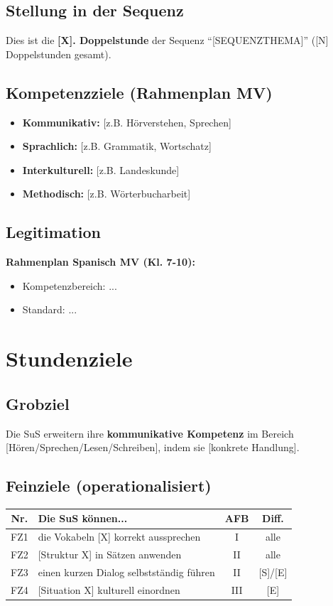 \documentclass[11pt,a4paper]{article}
\newcommand{\reihenthema}{[SEQUENZTHEMA]}          %
\newcommand{\stundennummer}{[X]}                   %
\newcommand{\reihenstunden}{[N]}                   %
\begin{document}
\subsection{Stellung in der Sequenz}
Dies ist die \textbf{\stundennummer. Doppelstunde} der Sequenz ``\reihenthema'' (\reihenstunden{} Doppelstunden gesamt).

\subsection{Kompetenzziele (Rahmenplan MV)}
\begin{itemize}
    \item \textbf{Kommunikativ:} [z.B. Hörverstehen, Sprechen]
    \item \textbf{Sprachlich:} [z.B. Grammatik, Wortschatz]
    \item \textbf{Interkulturell:} [z.B. Landeskunde]
    \item \textbf{Methodisch:} [z.B. Wörterbucharbeit]
\end{itemize}

\subsection{Legitimation}
\textbf{Rahmenplan Spanisch MV (Kl. 7-10):}
\begin{itemize}
    \item Kompetenzbereich: ...
    \item Standard: ...
\end{itemize}

\section{Stundenziele}

\subsection{Grobziel}
Die SuS erweitern ihre \textbf{kommunikative Kompetenz} im Bereich [Hören/Sprechen/Lesen/Schreiben], indem sie [konkrete Handlung].

\subsection{Feinziele (operationalisiert)}
\begin{tabular}{|c|p{8cm}|c|c|}
\hline
\textbf{Nr.} & \textbf{Die SuS können...} & \textbf{AFB} & \textbf{Diff.} \\
\hline
FZ1 & die Vokabeln [X] korrekt aussprechen & I & alle \\
\hline
FZ2 & [Struktur X] in Sätzen anwenden & II & alle \\
\hline
FZ3 & einen kurzen Dialog selbstständig führen & II & [S]/[E] \\
\hline
FZ4 & [Situation X] kulturell einordnen & III & [E] \\
\hline
\end{tabular}
\end{document}
